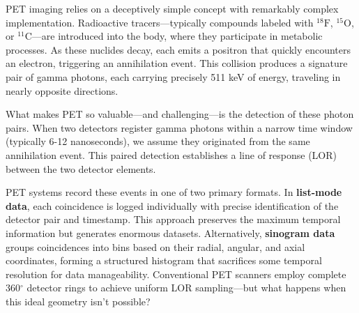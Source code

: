 \documentclass[
reprint,
superscriptaddress,
nofootinbib,
amsmath,amssymb,
aps,
prd,
]{revtex4-2}
\begin{document}
PET imaging relies on a deceptively simple concept with remarkably complex implementation. Radioactive tracers—typically compounds labeled with $^{18}\text{F}$, $^{15}\text{O}$, or $^{11}\text{C}$—are introduced into the body, where they participate in metabolic processes. As these nuclides decay, each emits a positron that quickly encounters an electron, triggering an annihilation event. This collision produces a signature pair of gamma photons, each carrying precisely 511 keV of energy, traveling in nearly opposite directions.


What makes PET so valuable—and challenging—is the detection of these photon pairs. When two detectors register gamma photons within a narrow time window (typically 6-12 nanoseconds), we assume they originated from the same annihilation event. This paired detection establishes a line of response (LOR) between the two detector elements.

PET systems record these events in one of two primary formats. In \textbf{list-mode data}, each coincidence is logged individually with precise identification of the detector pair and timestamp. This approach preserves the maximum temporal information but generates enormous datasets. Alternatively, \textbf{sinogram data} groups coincidences into bins based on their radial, angular, and axial coordinates, forming a structured histogram that sacrifices some temporal resolution for data manageability. Conventional PET scanners employ complete 360$^\circ$ detector rings to achieve uniform LOR sampling—but what happens when this ideal geometry isn't possible?
\end{document}
